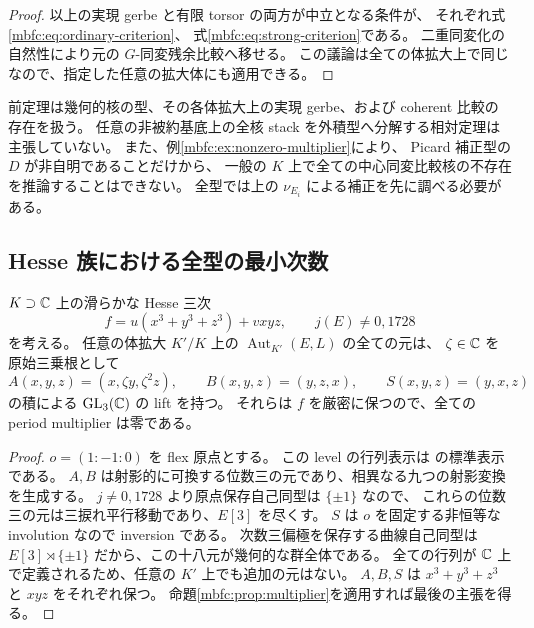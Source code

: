 \begin{proof}
以上の実現 gerbe と有限 torsor の両方が中立となる条件が、
それぞれ式\eqref{mbfc:eq:ordinary-criterion}、
式\eqref{mbfc:eq:strong-criterion}である。
二重同変化の自然性により元の $G$-同変残余比較へ移せる。
この議論は全ての体拡大上で同じなので、指定した任意の拡大体にも適用できる。
\end{proof}

\begin{remark}[全型という範囲]
\label{mbfc:rem:scope}
前定理は幾何的核の型、その各体拡大上の実現 gerbe、および coherent 比較の存在を扱う。
任意の非被約基底上の全核 stack を外積型へ分解する相対定理は主張していない。
また、例\ref{mbfc:ex:nonzero-multiplier}により、
Picard 補正型の $D$ が非自明であることだけから、
一般の $K$ 上で全ての中心同変比較核の不存在を推論することはできない。
全型では上の $\nu_{E_i}$ による補正を先に調べる必要がある。
\end{remark}

\subsection{Hesse 族における全型の最小次数}

\begin{lemma}
\label{mbfc:lem:hesse-lifts}
$K\supset\mathbb C$ 上の滑らかな Hesse 三次
\[
 f=u(x^3+y^3+z^3)+vxyz,\qquad j(E)\ne0,1728
\]
を考える。
任意の体拡大 $K'/K$ 上の $\operatorname{Aut}_{K'}(E,L)$ の全ての元は、
$\zeta\in\mathbb C$ を原始三乗根として
\[
 A(x,y,z)=(x,\zeta y,\zeta^2z),\qquad
 B(x,y,z)=(y,z,x),\qquad
 S(x,y,z)=(y,x,z)
\]
の積による $\operatorname{GL}_3(\mathbb C)$ の lift を持つ。
それらは $f$ を厳密に保つので、全ての period multiplier は零である。
\end{lemma}
\begin{proof}
$o=(1:-1:0)$ を flex 原点とする。
この level の行列表示は
\cite[\S4, pp.~246--247]{NFMArtebaniDolgachev}の標準表示である。
$A,B$ は射影的に可換する位数三の元であり、相異なる九つの射影変換を生成する。
$j\ne0,1728$ より原点保存自己同型は $\{\pm1\}$ なので、
これらの位数三の元は三捩れ平行移動であり、$E[3]$ を尽くす。
$S$ は $o$ を固定する非恒等な involution なので inversion である。
次数三偏極を保存する曲線自己同型は
$E[3]\rtimes\{\pm1\}$ だから、この十八元が幾何的な群全体である。
全ての行列が $\mathbb C$ 上で定義されるため、任意の $K'$ 上でも追加の元はない。
$A,B,S$ は $x^3+y^3+z^3$ と $xyz$ をそれぞれ保つ。
命題\ref{mbfc:prop:multiplier}を適用すれば最後の主張を得る。
\end{proof}

